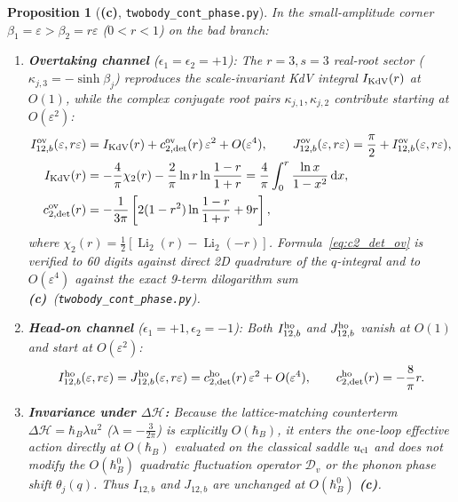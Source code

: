 \documentclass[11pt,a4paper]{article}
\newcommand{\Lc}{\textbf{(c)}}
\newcommand{\script}[1]{\texttt{#1}}
\newcommand{\dd}{\mathrm{d}}
\newtheorem{proposition}{Proposition}[section]
\begin{document}
\begin{proposition}[\Lc, \script{twobody\_cont\_phase.py}]\label{prop:bad_det_small}
In the small-amplitude corner $\beta_1=\varepsilon>\beta_2=r\varepsilon$ ($0<r<1$) on the bad branch:
\begin{enumerate}
\item \textbf{Overtaking channel} ($\epsilon_1=\epsilon_2=+1$): The $r=3,s=3$ real-root sector ($\kappa_{j,3}=-\sinh\beta_j$) reproduces the scale-invariant KdV integral $I_{\rm KdV}(r)$ at $O(1)$, while the complex conjugate root pairs $\kappa_{j,1},\kappa_{j,2}$ contribute starting at $O(\varepsilon^2)$:
\begin{align}
I_{12,b}^{\rm ov}(\varepsilon,r\varepsilon)&=I_{\rm KdV}(r)+c_{2,\rm det}^{\rm ov}(r)\,\varepsilon^2+O(\varepsilon^4),\qquad
J_{12,b}^{\rm ov}(\varepsilon,r\varepsilon)=\frac{\pi}{2}+I_{12,b}^{\rm ov}(\varepsilon,r\varepsilon),\label{eq:I_ov_bad_small}\\
I_{\rm KdV}(r)&=-\frac{4}{\pi}\chi_2(r)-\frac{2}{\pi}\ln r\ln\frac{1-r}{1+r}=\frac{4}{\pi}\int_0^r\frac{\ln x}{1-x^2}\,\dd x,\label{eq:I_KdV_def}\\
c_{2,\rm det}^{\rm ov}(r)&=-\frac{1}{3\pi}\left[2(1-r^2)\ln\frac{1-r}{1+r}+9r\right],\label{eq:c2_det_ov}
\end{align}
where $\chi_2(r)=\frac12[\operatorname{Li}_2(r)-\operatorname{Li}_2(-r)]$. Formula~\eqref{eq:c2_det_ov} is verified to 60 digits against direct 2D quadrature of the $q$-integral and to $O(\varepsilon^4)$ against the exact 9-term dilogarithm sum \Lc\ (\script{twobody\_cont\_phase.py}).
\item \textbf{Head-on channel} ($\epsilon_1=+1,\epsilon_2=-1$): Both $I_{12,b}^{\rm ho}$ and $J_{12,b}^{\rm ho}$ vanish at $O(1)$ and start at $O(\varepsilon^2)$:
\begin{equation}\label{eq:I_ho_bad_small}
I_{12,b}^{\rm ho}(\varepsilon,r\varepsilon)=J_{12,b}^{\rm ho}(\varepsilon,r\varepsilon)
=c_{2,\rm det}^{\rm ho}(r)\,\varepsilon^2+O(\varepsilon^4),\qquad
c_{2,\rm det}^{\rm ho}(r)=-\frac{8}{\pi}r.
\end{equation}
\item \textbf{Invariance under $\Delta\mathcal{H}$:} Because the lattice-matching counterterm $\Delta\mathcal{H}=\hbar_B\lambda u^2$ ($\lambda=-\frac{3}{2\pi}$) is explicitly $O(\hbar_B)$, it enters the one-loop effective action directly at $O(\hbar_B)$ evaluated on the classical saddle $u_{\rm cl}$ and does not modify the $O(\hbar_B^0)$ quadratic fluctuation operator $\mathcal{D}_v$ or the phonon phase shift $\theta_j(q)$. Thus $I_{12,b}$ and $J_{12,b}$ are unchanged at $O(\hbar_B^0)$ \Lc.
\end{enumerate}
\end{proposition}
\end{document}
